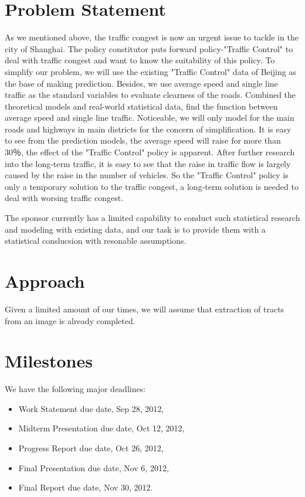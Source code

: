 \documentclass[12pt,letterpaper]{article}
\theoremstyle{definition}
\begin{document}
\section{Problem Statement}

As we mentioned above, the traffic congest is now an urgent issue to tackle in the city of Shanghai. The policy constitutor puts forward policy-"Traffic Control" to deal with traffic congest and want to know the suitability of this policy. To simplify our problem, we will use the existing "Traffic Control" data of Beijing as the base of making prediction. Besides, we use average speed and single line traffic as the standard variables to evaluate clearness of the roads. Combined the theoretical models and real-world statistical data, find the function between average speed and single line traffic. Noticeable, we will only model for the main roads and highways in main districts for the concern of simplification. It is easy to see from the prediction models, the average speed will raise for more than 30％, the effect of the "Traffic Control" policy is apparent. After further research into the long-term traffic, it is easy to see that the raise in traffic flow is largely caused by the raise in the number of vehicles. So the "Traffic Control" policy is only a temporary solution to the traffic congest, a long-term solution is needed to deal with worsing traffic congest.

The sponsor currently has a limited capability to conduct such statistical research and modeling with existing data, and our task is to provide them with a statistical conslucsion with resonable assumptions.  

\section{Approach}
Given a limited amount of our times, we will assume that extraction of 
tracts from an image is already completed.   
\section{Milestones}
We have the following major deadlines:
\begin{itemize}
    \item Work Statement due date, Sep 28, 2012,
    \item Midterm Presentation due date, Oct 12, 2012,
    \item Progress Report due date, Oct 26, 2012,
    \item Final Presentation due date, Nov 6, 2012,
    \item Final Report due date, Nov 30, 2012.
\end{itemize}
\end{document}
